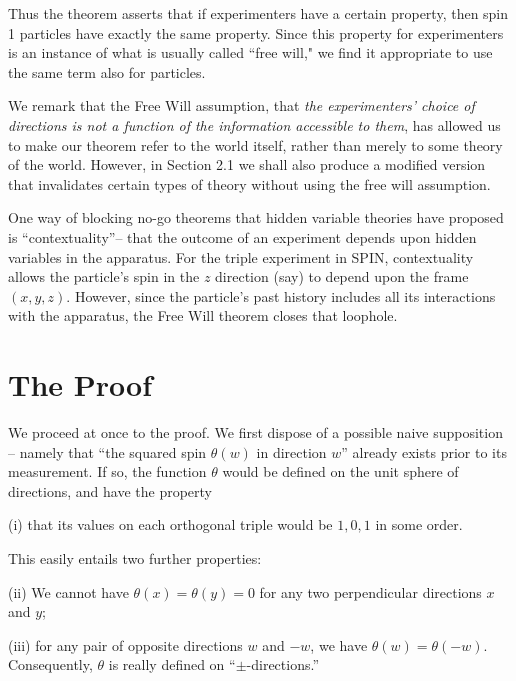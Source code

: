 \documentclass[12pt]{amsart}
\begin{document}
Thus the theorem asserts that if experimenters have a certain property, then 
spin 1 particles have exactly the same property.  Since this property for
experimenters is an instance of what is usually called ``free will," we find it
appropriate to use the same term also for particles.

   We remark that the Free Will assumption, that {\em the experimenters' choice of 
directions is not a function of the information accessible to them}, has allowed us to make our theorem refer to the world itself, rather than merely to some theory of the world.  However, in Section 2.1 we shall also produce a modified version that invalidates certain types of theory without using the free will assumption.

  One way of blocking no-go theorems that hidden variable theories have proposed is
``contextuality''-- that the outcome of an experiment depends upon hidden variables
in the apparatus. For the triple experiment in SPIN, contextuality allows the particle's
spin in the $z$ direction (say) to depend upon the frame $(x,y,z)$. However, since the particle's past history includes all its interactions with the apparatus, the Free Will theorem closes that loophole.
  
\section{The Proof} 

We proceed at once to the proof.  We first dispose of a possible naive
supposition -- namely that ``the squared spin $\theta(w)$ in direction $w$''
already exists prior to its measurement.  If so, the function $\theta$ would
be defined on the unit sphere of directions, and have the property

{(i)} that its values on each orthogonal triple would be $1,0,1$ in some order. 

This easily entails two further properties:

(ii) We cannot have $\theta(x) = \theta(y) = 0$ 
for any two perpendicular directions  $x$ and $y$; 

(iii) for any pair of opposite directions $w$ and $-w$, we have 
 $\theta(w) = \theta(-w)$.  Consequently, $\theta$ is really defined on
 ``$\pm$-directions.''
\end{document}
